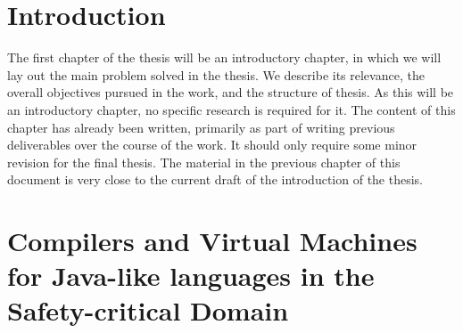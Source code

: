 \documentclass[a4paper,10pt]{report}
\begin{document}
\section{Introduction}

The first chapter of the thesis will be an introductory chapter, in
which we will lay out the main problem solved in the thesis.
We describe its relevance, the overall objectives pursued in the work,
and the structure of thesis.
As this will be an introductory chapter, no specific research is
required for it.
The content of this chapter has already been written, primarily as
part of writing previous deliverables over the course of the work.
It should only require some minor revision for the final thesis.
The material in the previous chapter of this document is very close to
the current draft of the introduction of the thesis.

\section{Compilers and Virtual Machines for Java-like languages in the
  Safety-critical Domain}
\end{document}
